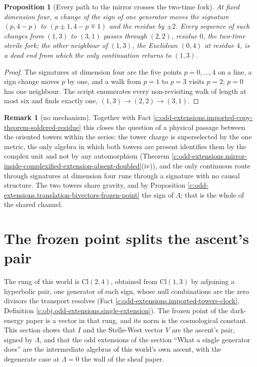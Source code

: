 \documentclass[11pt]{article}
\newtheorem{proposition}[theorem]{Proposition}
\theoremstyle{definition}
\newtheorem{remark}[theorem]{Remark}
\theoremstyle{plain}
\providecommand{\Cl}{}\renewcommand{\Cl}{\mathrm{Cl}}
\begin{document}
\begin{proposition}[Every path to the mirror crosses the two-time fork]\label{c:odd-extensions.every-path-mirror-crosses-two-time}
At fixed dimension four, a change of the sign of one generator moves the signature $(p, 4-p)$ to $(p \pm 1, 4 - p \mp 1)$ and the residue by $\pm 2$. Every sequence of such changes from $(1,3)$ to $(3,1)$ passes through $(2,2)$, residue $0$, the two-time sterile fork; the other neighbour of $(1,3)$, the Euclidean $(0,4)$ at residue $4$, is a dead end from which the only continuation returns to $(1,3)$.
\end{proposition}
\begin{proof}
The signatures at dimension four are the five points $p = 0, \ldots, 4$ on a line, a sign change moves $p$ by one, and a walk from $p = 1$ to $p = 3$ visits $p = 2$; $p = 0$ has one neighbour. The script enumerates every non-revisiting walk of length at most six and finds exactly one, $(1,3) \to (2,2) \to (3,1)$.

\end{proof}

\begin{remark}[no mechanism]\label{c:note.odd-extensions.no-mechanism}
Together with Fact \ref{c:odd-extensions.imported-copy-theorem-soldered-residue} this closes the question of a physical passage between the oriented towers within the series: the tower charge is superselected by the one metric, the only algebra in which both towers are present identifies them by the complex unit and not by any automorphism (Theorem \ref{c:odd-extensions.mirror-inside-complexified-extension-absent-doubled}(iv)), and the only continuous route through signatures at dimension four runs through a signature with no causal structure. The two towers share gravity, and by Proposition \ref{c:odd-extensions.translation-bivectors-frozen-point} the sign of $\Lambda$; that is the whole of the shared channel.
\end{remark}

\section{The frozen point splits the ascent's pair}

\label{c:note.odd-extensions.setting-frozen-point-splits-ascents-pair}
The rung of this world is $\Cl(2,4)$, obtained from $\Cl(1,3)$ by adjoining a hyperbolic pair, one generator of each sign, whose null combinations are the zero divisors the transport resolves (Fact \ref{c:odd-extensions.imported-towers-clock}, Definition \ref{c:obj.odd-extensions.single-extension}). The frozen point of the dark-energy paper is a vector in that rung, and its norm is the cosmological constant. This section shows that $I$ and the Stelle-West vector $V$ are the ascent's pair, signed by $\Lambda$, and that the odd extensions of the section ``What a single generator does'' are the intermediate algebras of this world's own ascent, with the degenerate case at $\Lambda = 0$ the wall of the sheaf paper.
\end{document}

